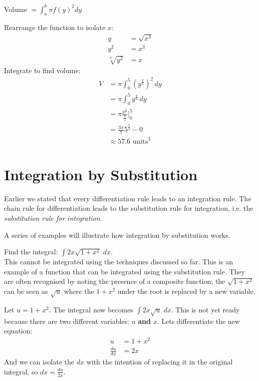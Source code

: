 \solution Volume $=\int_{a}^{b} \pi f(y)^2 dy$\\
\begin{multicols}{2}
Rearrange the function to isolate $x$:
	\begin{align*}
	y&=\sqrt{x^3}\\
	y^2&=x^3\\
	\sqrt[3]{y^2}&=x\end{align*}
Integrate to find volume:\\
	\begin{align*}V&=\pi\int_{0}^{5} (y^{\frac{2}{3}})^2\,dy\\
	&=\pi\int_{0}^{5} y^{\frac{4}{3}}\,dy\\
	&=\pi\frac{y^{\frac{7}{3}}}{\frac{7}{3}}\bigg\vert_{0}^{5}\\
	&=\frac{3\pi}{7}5^{\frac{7}{3}}-0\\
	&\approx 57.6 \,\,\mathrm{units}^3
	\end{align*}
\end{multicols}

\section{Integration by Substitution}
Earlier we stated that every differentiation rule leads to an integration rule. The chain rule for differentiation leads to the substitution rule for integration, i.e. the \emph{substitution rule for integration}. 

A series of examples will illustrate how integration by substitution works.

\example Find the integral: $\int 2 x \sqrt{1 +x^{2}}\; d x$.\medskip\\
\solution This cannot be integrated using the techniques discussed so far. This is an example of a function that can be integrated using the substitution rule. They are often recognised by noting the presence of a composite function; the $\sqrt{1 +x^{2}}$ can be seen as $\sqrt{u}$ where the $1+x^2$ under the root is replaced by a new variable.

Let $u=1+x^2$. The integral now becomes $\int 2x\sqrt{u}\; dx$. This is not yet ready because there are two different variables: $u$ \textbf{and} $x$. Lets differentiate the new equation:
\begin{align*}
u&=1+x^2\\
\frac{du}{dx}&=2x
\end{align*}
And we can isolate the $dx$ with the intention of replacing it in the original integral, so $\displaystyle dx=\frac{du}{2x}$.

